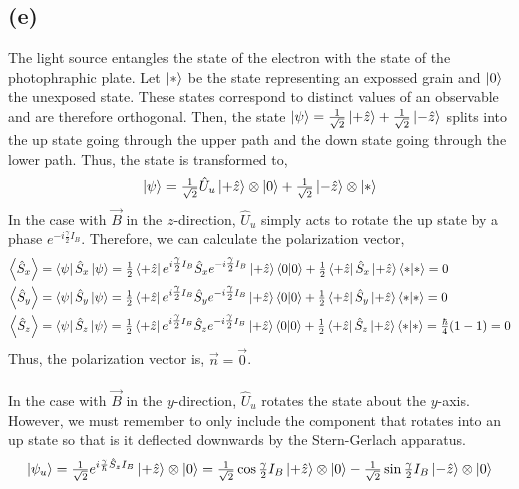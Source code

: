 \documentclass[12pt]{extarticle}
\begin{document}
\subsection*{(e)}

The light source entangles the state of the electron with the state of the photophraphic plate. Let $\left| * \right>$ be the state representing an expossed grain and $\left| 0 \right>$ the unexposed state. These states correspond to distinct values of an observable and are therefore orthogonal. Then, the state $\left| \psi \right> = \frac{1}{\sqrt{2}} \left| +\hat{z} \right> + \frac{1}{\sqrt{2}} \left| -\hat{z} \right>$ splits into the up state going through the upper path and the down state going through the lower path. Thus, the state is transformed to,
\[\left| \psi \right> = \tfrac{1}{\sqrt{2}} \hat{U}_u \left| +\hat{z} \right> \otimes \left| 0 \right> + \tfrac{1}{\sqrt{2}} \left| -\hat{z} \right> \otimes \left| * \right> \]   
In the case with $\vec{B}$ in the $z$-direction, $\hat{U}_u$ simply acts to rotate the up state by a phase $e^{-i \tfrac{\gamma}{2} I_B}$. Therefore, we can calculate the polarization vector,
\begin{align*}
\left< \hat{S}_x \right> & = \left< \psi \right| \hat{S}_x \left| \psi \right> = \tfrac{1}{2} \left< + \hat{z} \right| e^{i \tfrac{\gamma}{2} I_B} \hat{S}_x e^{-i \tfrac{\gamma}{2} I_B} \left| +\hat{z} \right> \left< 0 | 0 \right> + \tfrac{1}{2} \left< + \hat{z} \right| \hat{S}_x \left| +\hat{z} \right> \left< * | * \right> = 0\\
\left< \hat{S}_y \right> & = \left< \psi \right| \hat{S}_y \left| \psi \right> = \tfrac{1}{2} \left< + \hat{z} \right| e^{i \tfrac{\gamma}{2} I_B} \hat{S}_y e^{-i \tfrac{\gamma}{2} I_B} \left| +\hat{z} \right> \left< 0 | 0 \right> + \tfrac{1}{2} \left< + \hat{z} \right| \hat{S}_y \left| +\hat{z} \right> \left< * | * \right> = 0\\
\left< \hat{S}_z \right> & = \left< \psi \right| \hat{S}_z \left| \psi \right> = \tfrac{1}{2} \left< + \hat{z} \right| e^{i \tfrac{\gamma}{2} I_B} \hat{S}_z e^{-i \tfrac{\gamma}{2} I_B} \left| +\hat{z} \right> \left< 0 | 0 \right> + \tfrac{1}{2} \left< + \hat{z} \right| \hat{S}_z \left| +\hat{z} \right> \left< * | * \right> = \tfrac{\hbar}{4}(1 - 1) = 0  \\
\end{align*} 
Thus, the polarization vector is, $\vec{n} = \vec{0}$. \\\\
In the case with $\vec{B}$ in the $y$-direction, $\hat{U}_u$ rotates the state about the $y$-axis. However, we must remember to only include the component that rotates into an up state so that is it deflected downwards by the Stern-Gerlach apparatus.
\[\left| \psi_u \right> = \tfrac{1}{\sqrt{2}} e^{i \frac{\gamma}{\hbar} \hat{S}_z I_B} \left| + \hat{z} \right>  \otimes \left| 0 \right> = \tfrac{1}{\sqrt{2}} \cos{\tfrac{\gamma}{2} I_B} \left| + \hat{z} \right>  \otimes \left| 0 \right> - \tfrac{1}{\sqrt{2}} \sin{\tfrac{\gamma}{2} I_B} \left| - \hat{z} \right>  \otimes \left| 0 \right> \]
\end{document}
